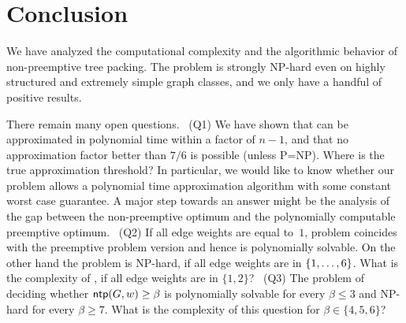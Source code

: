 

\section{Conclusion}
\label{sec:conclusion}
We have analyzed the computational complexity and the algorithmic behavior of non-preemptive
tree packing.
The problem is strongly NP-hard even on highly structured and extremely simple graph classes,
and we only have a handful of positive results.

There remain many open questions.
~(Q1) We have shown that {\xxxNTP} can be approximated in polynomial time within a factor of $n-1$, 
and that no approximation factor better than $7/6$ is possible (unless P=NP).
Where is the true approximation threshold?
In particular, we would like to know whether our problem allows a polynomial time approximation
algorithm with some constant worst case guarantee.
A major step towards an answer might be the analysis of the gap between the non-preemptive optimum 
and the polynomially computable preemptive optimum.
~(Q2) If all edge weights are equal to~$1$, problem {\xxxNTP} coincides with the preemptive problem 
version and hence is polynomially solvable.
On the other hand the problem is NP-hard, if all edge weights are in $\{ 1, \ldots, 6 \}$. 
What is the complexity of {\xxxNTP}, if all edge weights are in $\{1,2\}$?
~(Q3) The problem of deciding whether $\operatorname{\textsf{ntp}}(G,w)\ge\beta$ is polynomially solvable for 
every $\beta\le3$ and NP-hard for every $\beta\ge7$.
What is the complexity of this question for $\beta\in\{4,5,6\}$?

